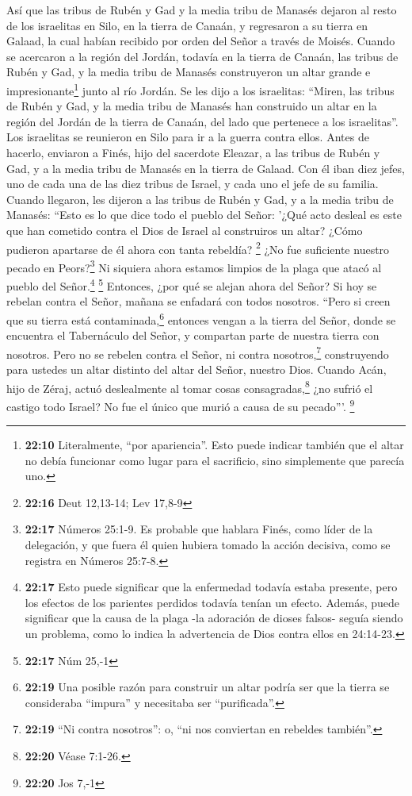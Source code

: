 Así que las tribus de Rubén y Gad y la media tribu de
Manasés dejaron al resto de los israelitas en Silo, en la tierra de
Canaán, y regresaron a su tierra en Galaad, la cual habían recibido por
orden del Señor a través de Moisés.  Cuando se acercaron
a la región del Jordán, todavía en la tierra de Canaán, las tribus de
Rubén y Gad, y la media tribu de Manasés construyeron un altar grande e
impresionante\footnote{\textbf{22:10} Literalmente, ``por apariencia''.
  Esto puede indicar también que el altar no debía funcionar como lugar
  para el sacrificio, sino simplemente que parecía uno.} junto al río
Jordán.  Se les dijo a los israelitas: ``Miren, las
tribus de Rubén y Gad, y la media tribu de Manasés han construido un
altar en la región del Jordán de la tierra de Canaán, del lado que
pertenece a los israelitas''.  Los israelitas se
reunieron en Silo para ir a la guerra contra ellos. 
Antes de hacerlo, enviaron a Finés, hijo del sacerdote Eleazar, a las
tribus de Rubén y Gad, y a la media tribu de Manasés en la tierra de
Galaad.  Con él iban diez jefes, uno de cada una de las
diez tribus de Israel, y cada uno el jefe de su familia. 
Cuando llegaron, les dijeron a las tribus de Rubén y Gad, y a la media
tribu de Manasés:  ``Esto es lo que dice todo el pueblo
del Señor: '¿Qué acto desleal es este que han cometido contra el Dios de
Israel al construiros un altar? ¿Cómo pudieron apartarse de él ahora con
tanta rebeldía? \footnote{\textbf{22:16} Deut 12,13-14; Lev 17,8-9}
 ¿No fue suficiente nuestro pecado en Peors?\footnote{\textbf{22:17}
  Números 25:1-9. Es probable que hablara Finés, como líder de la
  delegación, y que fuera él quien hubiera tomado la acción decisiva,
  como se registra en Números 25:7-8.} Ni siquiera ahora estamos limpios
de la plaga que atacó al pueblo del Señor.\footnote{\textbf{22:17} Esto
  puede significar que la enfermedad todavía estaba presente, pero los
  efectos de los parientes perdidos todavía tenían un efecto. Además,
  puede significar que la causa de la plaga -la adoración de dioses
  falsos- seguía siendo un problema, como lo indica la advertencia de
  Dios contra ellos en 24:14-23.} \footnote{\textbf{22:17} Núm 25,-1}
 Entonces, ¿por qué se alejan ahora del Señor? Si hoy se
rebelan contra el Señor, mañana se enfadará con todos nosotros.
 ``Pero si creen que su tierra está
contaminada,\footnote{\textbf{22:19} Una posible razón para construir un
  altar podría ser que la tierra se consideraba ``impura'' y necesitaba
  ser ``purificada''.} entonces vengan a la tierra del Señor, donde se
encuentra el Tabernáculo del Señor, y compartan parte de nuestra tierra
con nosotros. Pero no se rebelen contra el Señor, ni contra
nosotros,\footnote{\textbf{22:19} ``Ni contra nosotros'': o, ``ni nos
  conviertan en rebeldes también''.} construyendo para ustedes un altar
distinto del altar del Señor, nuestro Dios.  Cuando Acán,
hijo de Zéraj, actuó deslealmente al tomar cosas consagradas,\footnote{\textbf{22:20}
  Véase 7:1-26.} ¿no sufrió el castigo todo Israel? No fue el único que
murió a causa de su pecado'''. \footnote{\textbf{22:20} Jos 7,-1}

